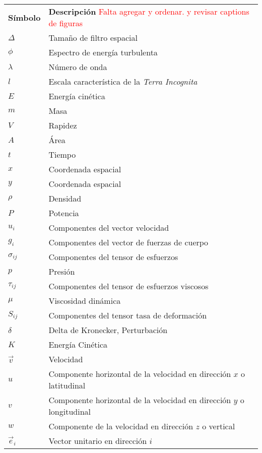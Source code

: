 
\begin{tabular}{ll}
	\textbf{Símbolo} & \textbf{Descripción} \textcolor{red}{Falta agregar y ordenar. y revisar captions de figuras} \\
	$\Delta$ & Tamaño de filtro espacial  \\
	$\phi$ & Espectro de energía turbulenta  \\
	$\lambda$ & Número de onda  \\
	$l$ & Escala característica de la \emph{Terra Incognita}  \\
	$E$ & Energía cinética  \\
	$m$ & Masa    \\
	$V$ & Rapidez     \\
	$A$ & Área   \\
	$t$ & Tiempo     \\
	$x$ & Coordenada espacial  \\
	$y$ & Coordenada espacial  \\
	$\rho$ & Densidad     \\
	$P$ & Potencia    \\
	$u_i$ & Componentes del vector velocidad     \\
	$g_i$ & Componentes del vector de fuerzas de cuerpo     \\
	$\sigma_{ij}$ & Componentes del tensor de esfuerzos     \\
	$p$ & Presión     \\
	$\tau_{ij}$ & Componentes del tensor de esfuerzos viscosos    \\
	$\mu$ & Viscosidad dinámica     \\
	$S_{ij}$ & Componentes del tensor tasa de deformación    \\
	$\delta$ & Delta de Kronecker, Perturbación     \\
	$K$ & Energía Cinética      \\
	$\vec{v}$ & Velocidad  \\
	$u$ & Componente horizontal de la velocidad en dirección $x$ o latitudinal \\
	$v$ & Componente horizontal de la velocidad en dirección $y$ o longitudinal  \\
	$w$ & Componente de la velocidad en dirección $z$ o vertical  \\
	$\vec{e}_i$ & Vector unitario en dirección $i$ \\
\end{tabular}
	\newpage
